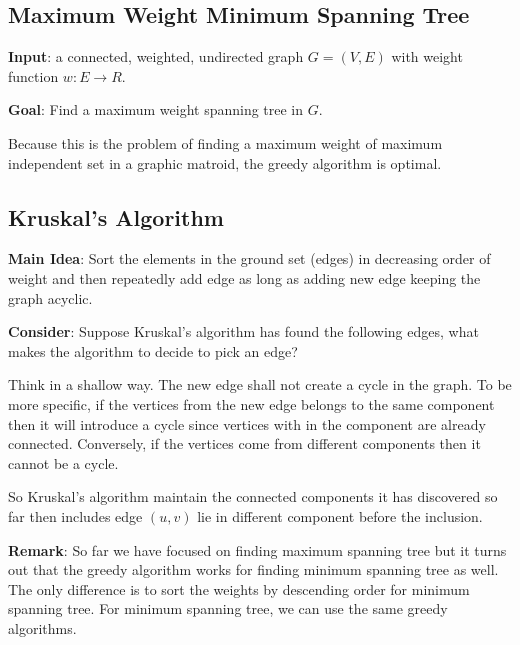 \subsection{Maximum Weight Minimum Spanning Tree}
\textbf{Input}: a connected, weighted, undirected graph $ G = (V , E) $ with weight function $ w : E \to R $. 

\textbf{Goal}: Find a maximum weight spanning tree in $G$. 

Because this is the problem of finding a maximum weight of maximum independent set in a graphic matroid, the greedy algorithm is optimal.

\subsection{Kruskal's Algorithm}
\textbf{Main Idea}: Sort the elements in the ground set (edges) in decreasing order of weight and then repeatedly add edge as long as adding new edge keeping the graph acyclic.

\textbf{Consider}: Suppose Kruskal's algorithm has found the following edges, what makes the algorithm to decide to pick an edge?

Think in a shallow way. The new edge shall not create a cycle in the graph. To be more specific, if the vertices from the new edge belongs to the same component then it will introduce a cycle since vertices with in the component are already connected. Conversely, if the vertices come from different components then it cannot be a cycle.

So Kruskal's algorithm maintain the connected components it has discovered so far then includes edge $ (u, v) $ lie in different component before the inclusion.

\textbf{Remark}: So far we have focused on finding maximum spanning tree but it turns out that the greedy algorithm works for finding minimum spanning tree as well. The only difference is to sort the weights by descending order for minimum spanning tree. For minimum spanning tree, we can use the same greedy algorithms.

